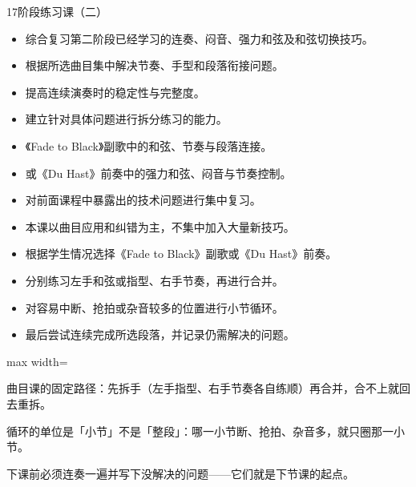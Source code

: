 \begin{lessoncard}{17}{阶段练习课（二）}
\begin{itemize}
\item 综合复习第二阶段已经学习的连奏、闷音、强力和弦及和弦切换技巧。
\item 根据所选曲目集中解决节奏、手型和段落衔接问题。
\item 提高连续演奏时的稳定性与完整度。
\item 建立针对具体问题进行拆分练习的能力。
\end{itemize}
\begin{itemize}
\item 《Fade to Black》副歌中的和弦、节奏与段落连接。
\item 或《Du Hast》前奏中的强力和弦、闷音与节奏控制。
\item 对前面课程中暴露出的技术问题进行集中复习。
\item 本课以曲目应用和纠错为主，不集中加入大量新技巧。
\end{itemize}
\begin{itemize}
\item 根据学生情况选择《Fade to Black》副歌或《Du Hast》前奏。
\item 分别练习左手和弦或指型、右手节奏，再进行合并。
\item 对容易中断、抢拍或杂音较多的位置进行小节循环。
\item 最后尝试连续完成所选段落，并记录仍需解决的问题。
\end{itemize}
\begin{fignote}
\begin{center}
\begin{adjustbox}{max width=\textwidth}
\steparrow
{}\steparrow
{}\steparrow
{}\steparrow
{}
\end{adjustbox}
\end{center}
\begin{fignotes}
\item 曲目课的固定路径：先拆手（左手指型、右手节奏各自练顺）再合并，合不上就回去重拆。
\item 循环的单位是「小节」不是「整段」：哪一小节断、抢拍、杂音多，就只圈那一小节。
\item 下课前必须连奏一遍并写下没解决的问题——它们就是下节课的起点。
\end{fignotes}
\end{fignote}
\end{lessoncard}

